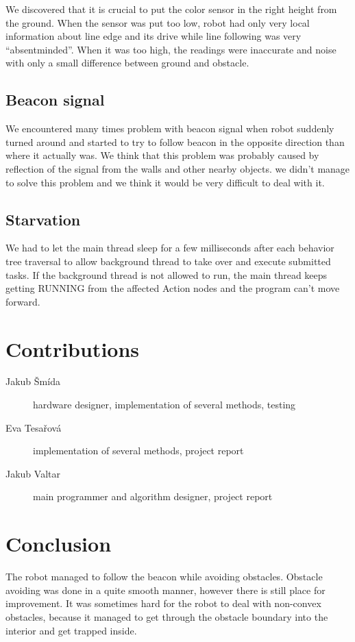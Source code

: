 \documentclass[a4paper]{article}
\begin{document}
We discovered that it is crucial to put the color sensor in the right height from the ground. When the sensor was put too low, robot had only very local information about line edge and its drive while line following was very ``absentminded''. When it was too high, the readings were inaccurate and noise with only a small difference between ground and obstacle.

\subsection*{Beacon signal}
We encountered many times problem with beacon signal when robot suddenly turned around and started to try to follow beacon in the opposite direction than where it actually was. We think that this problem was probably caused by reflection of the signal from the walls and other nearby objects. we didn't manage to solve this problem and we think it would be very difficult to deal with it.

\subsection*{Starvation}
We had to let the main thread sleep for a few milliseconds after each behavior tree traversal to allow background thread to take over and execute submitted tasks. If the background thread is not allowed to run, the main thread keeps getting RUNNING from the affected Action nodes and the program can't move forward.

\section*{Contributions}
\begin{description}
\item[Jakub \v{S}m\'{i}da] hardware designer, implementation of several methods, testing
\item[Eva Tesa\v{r}ov\'{a}] implementation of several methods, project report
\item[Jakub Valtar] main programmer and algorithm designer, project report
\end{description}

\section*{Conclusion}
The robot managed to follow the beacon while avoiding obstacles. Obstacle avoiding was done in a quite smooth manner, however there is still place for improvement. It was sometimes hard for the robot to deal with non-convex obstacles, because it managed to get through the obstacle boundary into the interior and get trapped inside.
\end{document}
